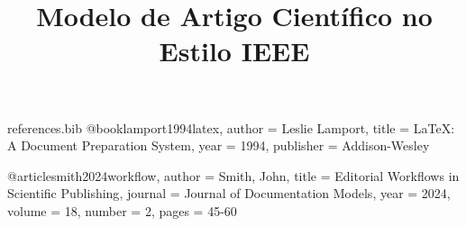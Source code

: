 \begin{filecontents*}{references.bib}
@book{lamport1994latex,
  author    = {Leslie Lamport},
  title     = {LaTeX: A Document Preparation System},
  year      = {1994},
  publisher = {Addison-Wesley}
}

@article{smith2024workflow,
  author  = {Smith, John},
  title   = {Editorial Workflows in Scientific Publishing},
  journal = {Journal of Documentation Models},
  year    = {2024},
  volume  = {18},
  number  = {2},
  pages   = {45-60}
}
\end{filecontents*}

\documentclass[conference]{IEEEtran}

\usepackage[brazil]{babel}
\usepackage[utf8]{inputenc}
\usepackage[T1]{fontenc}
\usepackage{cite}
\usepackage{graphicx}
\usepackage{amsmath,amssymb}
\usepackage{booktabs,multirow,array}
\usepackage[hidelinks]{hyperref}

\title{Modelo de Artigo Científico no Estilo IEEE}

\author{
}


\maketitle

\begin{abstract}
Este modelo apresenta a estrutura básica de um artigo científico no estilo IEEE, incluindo resumo, palavras-chave, seções com referências cruzadas, figura com legenda e bibliografia externa gerenciada via BibTeX.
\end{abstract}

\begin{IEEEkeywords}
LaTeX, IEEE, BibTeX, editoração científica, documentação técnica
\end{IEEEkeywords}

\section{Introdução}
A padronização de artigos científicos é essencial para garantir leitura fluida, consistência visual e facilidade na gestão editorial. O estilo IEEE é amplamente utilizado em áreas de engenharia e computação \cite{lamport1994latex}.

\section{Metodologia}
\label{sec:metodologia}
Como mostrado na Seção~\ref{sec:resultados}, a organização do texto e o uso adequado de referências cruzadas contribuem para a clareza do manuscrito. O fluxo editorial também pode ser tratado de forma estruturada \cite{smith2024workflow}.


